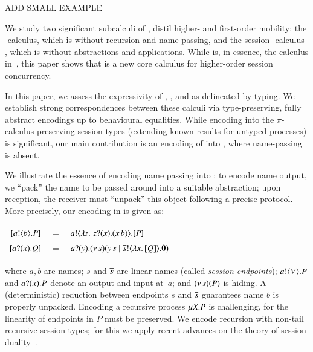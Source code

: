 ADD SMALL EXAMPLE 

We study two significant subcalculi of \HOp, 
distil higher- and first-order mobility:
the \HO-calculus, which is \HOp without recursion and name passing, and 
the session \sessp-calculus , which is \HOp without abstractions and applications.  
While \sessp is, 
in essence, the calculus in~\cite{honda.vasconcelos.kubo:language-primitives}, 
this paper shows that \HO  is a new core calculus 
for higher-order session concurrency.



In this paper,  we assess the expressivity 
 of \HOp, \HO, and \sessp as delineated by typing. 
We establish strong correspondences between 
these calculi  via type-preserving, fully abstract encodings up to 
behavioural equalities. While encoding \HOp 
into the $\pi$-calculus preserving session types 
(extending  known  results for untyped processes) is 
significant, 
our main contribution is 
an encoding of \HOp into \HO, where name-passing is absent.  

We illustrate the essence of encoding name passing into \HO: 
to encode name output, we ``pack''
the name to be passed around into a suitable abstraction; 
upon reception, the receiver must ``unpack'' this object following a precise protocol.
More precisely, our encoding 
in \HO is given as:
\begin{center}
\begin{tabular}{rcll}
  $[\!\![a ! \langle b \rangle . P]\!\!]$	&$=$&	$a ! \langle  \lambda z.\,\,z ? (x) . (x\, {b})  \rangle . [\!\![P]\!\!]$ \\
  $[\!\![a ? (x) . Q]\!\!]$	&$=$&	$a ? (y) . (\nu\, s)(y\, {s} \;|\; \overline{s} ! \langle \lambda x.\,[\!\![Q]\!\!] \rangle . \mathbf{0})$
\end{tabular}
\end{center}
\noi where $a,b$ are names; $s$ and $\overline{s}$ are 
linear names (called \emph{session endpoints});
$a ! \langle V \rangle . P$ and 
$a ? (x) . P$ denote an output and input at~$a$;   
and $(\nu\, s)(P)$ is hiding. 
A (deterministic) reduction between   endpoints 
$s$ and $\overline{s}$ guarantees name $b$ is properly unpacked.
Encoding a recursive process $\mu X. P$ is  challenging, for 
the linearity of endpoints in $P$ must be preserved.
We encode recursion with non-tail recursive session types; for this 
we apply recent advances on the theory of session duality~\cite{TGC14,DBLP:journals/corr/abs-1202-2086}.

